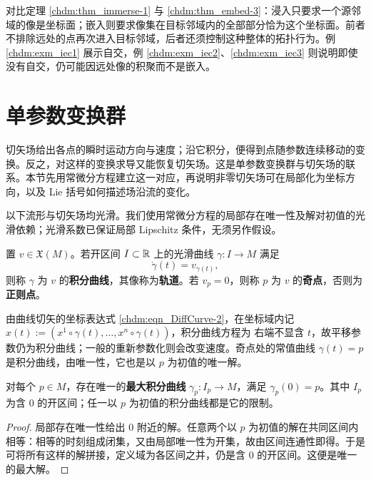 对比定理 \ref{chdm:thm_immerse-1} 与 \ref{chdm:thm_embed-3}：浸入只要求一个源邻域的像是坐标面；嵌入则要求像集在目标邻域内的全部部分恰为这个坐标面。前者不排除远处的点再次进入目标邻域，后者还须控制这种整体的拓扑行为。例 \ref{chdm:exm_iec1} 展示自交，例 \ref{chdm:exm_iec2}、\ref{chdm:exm_iec3} 则说明即使没有自交，仍可能因远处像的积聚而不是嵌入。


\section{单参数变换群}\label{chdm:sec_One-Parameter-Transformations-Groups}

切矢场给出各点的瞬时运动方向与速度；沿它积分，便得到点随参数连续移动的变换。反之，对这样的变换求导又能恢复切矢场。这是单参数变换群与切矢场的联系。本节先用常微分方程建立这一对应，再说明非零切矢场可在局部化为坐标方向，以及 Lie 括号如何描述场沿流的变化。

以下流形与切矢场均光滑。我们使用常微分方程的局部存在唯一性及解对初值的光滑依赖；光滑系数已保证局部 Lipschitz 条件，无须另作假设。

\begin{definition}
    置 $v\in\mathfrak X(M)$。若开区间 $I\subset\mathbb{R}$ 上的光滑曲线 $\gamma:I\to M$ 满足
    \[
        \dot\gamma(t)=v_{\gamma(t)},
    \]
    则称 $\gamma$ 为 $v$ 的\textbf{积分曲线}，其像称为\textbf{轨道}。若 $v_p=0$，则称 $p$ 为 $v$ 的\textbf{奇点}，否则为\textbf{正则点}。
\end{definition}

由曲线切矢的坐标表达式 \eqref{chdm:eqn_DiffCurve-2}，在坐标域内记 $x(t):=(x^1\circ\gamma(t),\ldots,x^n\circ\gamma(t))$，积分曲线方程为
右端不显含 $t$，故平移参数仍为积分曲线；一般的重新参数化则会改变速度。奇点处的常值曲线 $\gamma(t)=p$ 是积分曲线，由唯一性，它也是以 $p$ 为初值的唯一解。

\begin{theorem}
    对每个 $p\in M$，存在唯一的\textbf{最大积分曲线} $\gamma_p:I_p\to M$，满足 $\gamma_p(0)=p$。其中 $I_p$ 为含 $0$ 的开区间；任一以 $p$ 为初值的积分曲线都是它的限制。
\end{theorem}
\begin{proof}
    局部存在唯一性给出 $0$ 附近的解。任意两个以 $p$ 为初值的解在共同区间内相等：相等的时刻组成闭集，又由局部唯一性为开集，故由区间连通性即得。于是可将所有这样的解拼接，定义域为各区间之并，仍是含 $0$ 的开区间。这便是唯一的最大解。
\end{proof}

